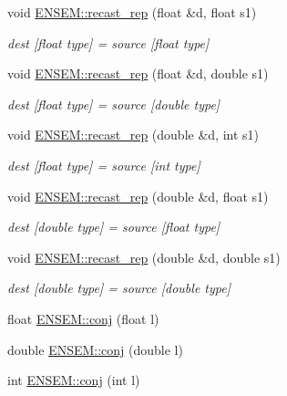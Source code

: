 \begin{DoxyCompactItemize}
void \mbox{\hyperlink{group__simpleword_ga9a35d7bf3c8e7160728164e4d077eb4f}{E\+N\+S\+E\+M\+::recast\+\_\+rep}} (float \&d, float s1)
\begin{DoxyCompactList}\small\item\em dest \mbox{[}float type\mbox{]} = source \mbox{[}float type\mbox{]} \end{DoxyCompactList}\item 
void \mbox{\hyperlink{group__simpleword_gad3aa40e2f2b149a85e571f6c4d757bac}{E\+N\+S\+E\+M\+::recast\+\_\+rep}} (float \&d, double s1)
\begin{DoxyCompactList}\small\item\em dest \mbox{[}float type\mbox{]} = source \mbox{[}double type\mbox{]} \end{DoxyCompactList}\item 
void \mbox{\hyperlink{group__simpleword_gada8b742bcffe9ceeb7cc10b48a11a174}{E\+N\+S\+E\+M\+::recast\+\_\+rep}} (double \&d, int s1)
\begin{DoxyCompactList}\small\item\em dest \mbox{[}float type\mbox{]} = source \mbox{[}int type\mbox{]} \end{DoxyCompactList}\item 
void \mbox{\hyperlink{group__simpleword_ga78492af33f3095694863918e99ec9d6a}{E\+N\+S\+E\+M\+::recast\+\_\+rep}} (double \&d, float s1)
\begin{DoxyCompactList}\small\item\em dest \mbox{[}double type\mbox{]} = source \mbox{[}float type\mbox{]} \end{DoxyCompactList}\item 
void \mbox{\hyperlink{group__simpleword_ga9c4fac4c3903b043a9a31c9036f875f7}{E\+N\+S\+E\+M\+::recast\+\_\+rep}} (double \&d, double s1)
\begin{DoxyCompactList}\small\item\em dest \mbox{[}double type\mbox{]} = source \mbox{[}double type\mbox{]} \end{DoxyCompactList}\item 
float \mbox{\hyperlink{group__simpleword_ga1952c9e46ce2b45d95d5bb33e32688c4}{E\+N\+S\+E\+M\+::conj}} (float l)
\item 
double \mbox{\hyperlink{group__simpleword_ga321a11547e3d6d0cac59dc6d035e8829}{E\+N\+S\+E\+M\+::conj}} (double l)
\item 
int \mbox{\hyperlink{group__simpleword_ga7677ae438b4fb0aa8fd7f9121b9d384b}{E\+N\+S\+E\+M\+::conj}} (int l)
\item 

\end{DoxyCompactItemize}
